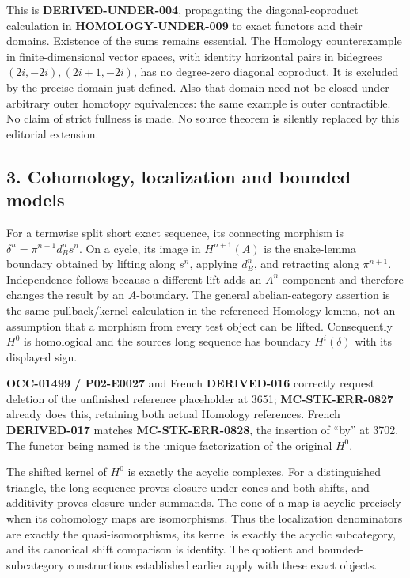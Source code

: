 \documentclass[11pt]{article}
\begin{document}
This is \textbf{DERIVED-UNDER-004},\allowbreak{} propagating the diagonal-coproduct calculation in \textbf{HOMOLOGY-UNDER-009} to exact functors and their domains. Existence of the sums remains essential. The Homology counterexample in finite-dimensional vector spaces,\allowbreak{} with identity horizontal pairs in bidegrees \((2i,-2i),(2i+1,-2i)\),\allowbreak{} has no degree-zero diagonal coproduct. It is excluded by the precise domain just defined. Also that domain need not be closed under arbitrary outer homotopy equivalences:\allowbreak{} the same example is outer contractible. No claim of strict fullness is made. No source theorem is silently replaced by this editorial extension.

\subsection{\texorpdfstring{3. Cohomology,\allowbreak{} localization and bounded models}{3.  localization and bounded models}}\label{proofs-3487-4161-cohomology-localization-and-bounded-models}

For a termwise split short exact sequence,\allowbreak{} its connecting morphism is \(\delta^n=\pi^{n+1}d_B^ns^n\). On a cycle,\allowbreak{} its image in \(H^{n+1}(A)\) is the snake-lemma boundary obtained by lifting along \(s^n\),\allowbreak{} applying \(d_B^n\),\allowbreak{} and retracting along \(\pi^{n+1}\). Independence follows because a different lift adds an \(A^n\)-component and therefore changes the result by an \(A\)-boundary. The general abelian-category assertion is the same pullback/\allowbreak{}kernel calculation in the referenced Homology lemma,\allowbreak{} not an assumption that a morphism from every test object can be lifted. Consequently \(H^0\) is homological and the source\textquotesingle s long sequence has boundary \(H^i(\delta)\) with its displayed sign.

\textbf{OCC-01499 /\allowbreak{} P02-E0027} and French \textbf{DERIVED-016} correctly request deletion of the unfinished reference placeholder at 3651; \textbf{MC-STK-ERR-0827} already does this,\allowbreak{} retaining both actual Homology references. French \textbf{DERIVED-017} matches \textbf{MC-STK-ERR-0828},\allowbreak{} the insertion of ``by'' at 3702. The functor being named is the unique factorization of the original \(H^0\).

The shifted kernel of \(H^0\) is exactly the acyclic complexes. For a distinguished triangle,\allowbreak{} the long sequence proves closure under cones and both shifts,\allowbreak{} and additivity proves closure under summands. The cone of a map is acyclic precisely when its cohomology maps are isomorphisms. Thus the localization denominators are exactly the quasi-isomorphisms,\allowbreak{} its kernel is exactly the acyclic subcategory,\allowbreak{} and its canonical shift comparison is identity. The quotient and bounded-subcategory constructions established earlier apply with these exact objects.
\end{document}
